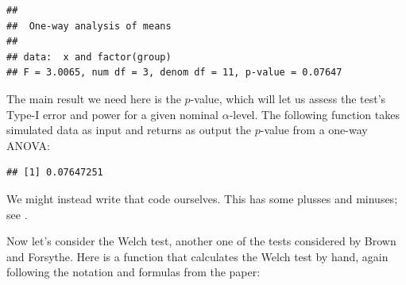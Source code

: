 \documentclass[
]{book}
\newenvironment{Shaded}{\begin{snugshade}}{\end{snugshade}}
\newcommand{\AttributeTok}[1]{\textcolor[rgb]{0.77,0.63,0.00}{#1}}
\newcommand{\ConstantTok}[1]{\textcolor[rgb]{0.00,0.00,0.00}{#1}}
\newcommand{\ControlFlowTok}[1]{\textcolor[rgb]{0.13,0.29,0.53}{\textbf{#1}}}
\newcommand{\FunctionTok}[1]{\textcolor[rgb]{0.00,0.00,0.00}{#1}}
\newcommand{\NormalTok}[1]{#1}
\newcommand{\OtherTok}[1]{\textcolor[rgb]{0.56,0.35,0.01}{#1}}
\newcommand{\SpecialCharTok}[1]{\textcolor[rgb]{0.00,0.00,0.00}{#1}}
\begin{document}
\begin{verbatim}
## 
##  One-way analysis of means
## 
## data:  x and factor(group)
## F = 3.0065, num df = 3, denom df = 11, p-value = 0.07647
\end{verbatim}

The main result we need here is the \(p\)-value, which will let us assess the test's Type-I error and power for a given nominal \(\alpha\)-level. The following function takes simulated data as input and returns as output the \(p\)-value from a one-way ANOVA:

\begin{Shaded}
\end{Shaded}

\begin{verbatim}
## [1] 0.07647251
\end{verbatim}

We might instead write that code ourselves.
This has some plusses and minuses; see \citet{optimize_code}.

Now let's consider the Welch test, another one of the tests considered by Brown and Forsythe.
Here is a function that calculates the Welch test by hand, again following the notation and formulas from the paper:
\end{document}
